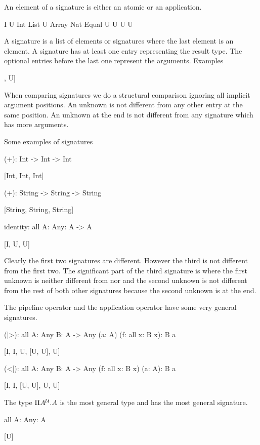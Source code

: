 An element of a signature is either an atomic or an application.
\begin{alba}
    I
    U
    Int
    List U
    Array Nat
    Equal U U
    U U
\end{alba}

A signature is a list of elements or signatures where the last element is an
element. A signature has at least one entry representing the result type. The
optional entries before the last one represent the arguments. Examples
\begin{alba}
    [Int, Int, Int]
    [Float, Float, Float]
    [I, U, U, U]
    [I, U, List U, List U]
    [I, I, U, [U, U], U]
\end{alba}

When comparing signatures we do a structural comparison ignoring all implicit
argument positions. An unknown is not different from any other entry at the same
position. An unknown at the end is not different from any signature which has
more arguments.

Some examples of signatures
\begin{alba}
    (+): Int -> Int -> Int

        [Int, Int, Int]


    (+): String -> String -> String

        [String, String, String]


    identity: all {A: Any}: A -> A

        [I, U, U]
\end{alba}

Clearly the first two signatures are different. However the third is not
different from the first two. The significant part of the third signature is
\code{[U, U]} where the first unknown is neither different from  nor
 and the second unknown is not different from the rest of both
other signatures because the second unknown is at the end.

The pipeline operator \code{|>} and the application operator \code{<|} have some
very general signatures.
\begin{alba}
    (|>): all {A: Any} {B: A -> Any} (a: A) (f: all x: B x): B a

        [I, I, U, [U, U], U]


    (<|): all {A: Any} {B: A -> Any} (f: all x: B x) (a: A): B a

        [I, I, [U, U], U, U]
\end{alba}

The type $\Pi A^{\cal{U}}. A$ is the most general type and has the most general
signature.
\begin{alba}
    all {A: Any}: A

        [U]
\end{alba}



